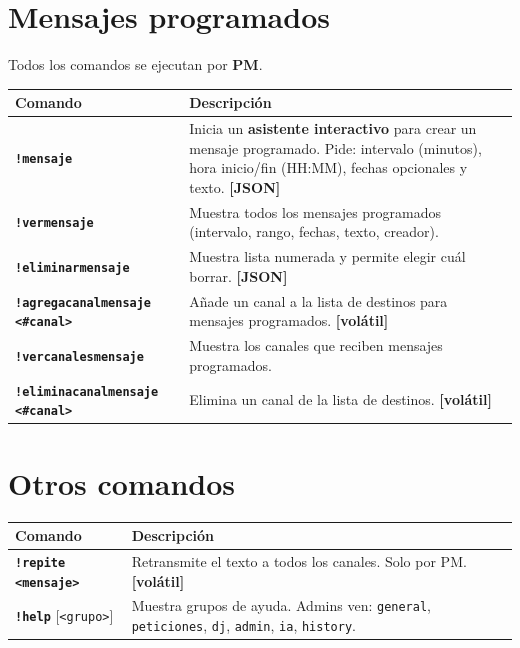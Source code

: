 \documentclass[a4paper,10pt]{article}
\newcommand{\cmd}[1]{\texttt{\color{cmdcolor}\bfseries #1}}
\newcommand{\param}[1]{\texttt{\color{paramcolor}<#1>}}
\newcommand{\persiste}{{\scriptsize\color{persistcolor}\textbf{[JSON]}}}
\newcommand{\volat}{{\scriptsize\color{volatilecolor}\textbf{[volátil]}}}
\begin{document}
\section{Mensajes programados}

Todos los comandos se ejecutan por \textbf{PM}.

\begin{tabularx}{\textwidth}{lX}
\toprule
\textbf{Comando} & \textbf{Descripción} \\
\midrule
\cmd{!mensaje} & Inicia un \textbf{asistente interactivo} para crear un mensaje programado. Pide: intervalo (minutos), hora inicio/fin (HH:MM), fechas opcionales y texto. \persiste \\[0.3em]
\cmd{!vermensaje} & Muestra todos los mensajes programados (intervalo, rango, fechas, texto, creador). \\[0.3em]
\cmd{!eliminarmensaje} & Muestra lista numerada y permite elegir cuál borrar. \persiste \\[0.3em]
\cmd{!agregacanalmensaje \param{\#canal}} & Añade un canal a la lista de destinos para mensajes programados. \volat \\[0.3em]
\cmd{!vercanalesmensaje} & Muestra los canales que reciben mensajes programados. \\[0.3em]
\cmd{!eliminacanalmensaje \param{\#canal}} & Elimina un canal de la lista de destinos. \volat \\
\bottomrule
\end{tabularx}

\section{Otros comandos}

\begin{tabularx}{\textwidth}{lX}
\toprule
\textbf{Comando} & \textbf{Descripción} \\
\midrule
\cmd{!repite \param{mensaje}} & Retransmite el texto a todos los canales. Solo por PM. \volat \\[0.3em]
\cmd{!help} [\param{grupo}] & Muestra grupos de ayuda. Admins ven: \texttt{general}, \texttt{peticiones}, \texttt{dj}, \texttt{admin}, \texttt{ia}, \texttt{history}. \\
\bottomrule
\end{tabularx}
\end{document}
